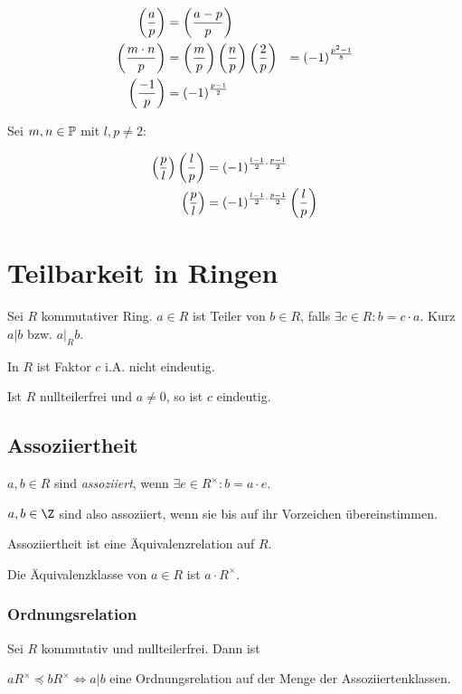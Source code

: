 \vspace*{-4mm}
\begin{align*}
	\left(\frac{a}{p}\right) &= \left(\frac{a-p}{p}\right) \\
	\left(\frac{m \cdot n}{p}\right) &= \left(\frac{m}{p}\right)\left(\frac{n}{p}\right)
	\left(\frac{2}{p}\right) &= (-1)^{\frac{p^2-1}{8}} \\
	\left(\frac{-1}{p}\right) &= (-1)^{\frac{p-1}{2}}
\end{align*}

Sei $m, n \in \mathbb{P}$ mit $l, p \neq 2$:

\vspace*{-4mm}
\begin{align*}
	\left(\frac{p}{l}\right)\left(\frac{l}{p}\right) &= (-1)^{\frac{l-1}{2}\cdot\frac{p-1}{2}} \\
	\left(\frac{p}{l}\right) &= (-1)^{\frac{l-1}{2}\cdot\frac{p-1}{2}} \left(\frac{l}{p}\right)
\end{align*}

\section*{Teilbarkeit in Ringen}

Sei $R$ kommutativer Ring. $a \in R$ ist Teiler von $b \in R$, falls $\exists c \in R : b = c \cdot a$. Kurz $a | b$ bzw. $a |_R b$.

In $R$ ist Faktor $c$ i.A. nicht eindeutig.

Ist $R$ nullteilerfrei und $a \neq 0$, so ist $c$ eindeutig.

\subsection*{Assoziiertheit}

$a, b \in R$ sind \emph{assoziiert}, wenn $\exists e \in R^\times : b = a\cdot e$.

$a, b \in \Z$ sind also assoziiert, wenn sie bis auf ihr Vorzeichen übereinstimmen.

Assoziiertheit ist eine Äquivalenzrelation auf $R$.

Die Äquivalenzklasse von $a \in R$ ist $a \cdot R^\times$.

\subsubsection*{Ordnungsrelation}

Sei $R$ kommutativ und nullteilerfrei. Dann ist

$aR^\times \preccurlyeq bR^\times \iff a | b$ eine Ordnungsrelation auf der Menge der Assoziiertenklassen.

